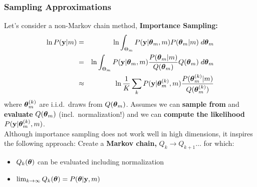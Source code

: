 \begin{frame}
\frametitle{Sampling Approximations}

\vspace*{-1ex}
Let's consider a non-Markov chain method, {\bf Importance Sampling:}\\
\vspace*{-2ex}
\begin{eqnarray*}
\ln P(\mathbf{y}|m) &=& \ln \int_{\Theta_m} P(\mathbf{y}|\boldsymbol{\theta}_m,m)
P(\boldsymbol{\theta}_m|m) \; d \boldsymbol{\theta}_m\\
&=& \ln \int_{\Theta_m} P(\mathbf{y}|\boldsymbol{\theta}_m,m)
\frac{P(\boldsymbol{\theta}_m|m)}{Q(\boldsymbol{\theta}_m)} Q(\boldsymbol{\theta}_m) \; d \boldsymbol{\theta}_m\\
&\approx & \ln \frac{1}{K} \sum_k P(\mathbf{y}|\boldsymbol{\theta}_m^{(k)},m)
\frac{P(\boldsymbol{\theta}_m^{(k)}|m)}{Q(\boldsymbol{\theta}_m^{(k)})} 
\end{eqnarray*}
where $\boldsymbol{\theta}_m^{(k)}$ are i.i.d.\ draws from  
$Q(\boldsymbol{\theta}_m)$. Assumes we can {\bf sample from} and {\bf evaluate} $Q(\boldsymbol{\theta}_m)$
(incl.\ normalization!) and we can {\bf compute the likelihood}
$P(\mathbf{y}|\boldsymbol{\theta}_m^{(k)},m)$. \\[2ex]

Although importance sampling does not work well in high dimensions,
it inspires the following approach:
Create a {\bf Markov chain,} $Q_k \rightarrow Q_{k+1} \ldots$ for which:
\begin{itemize}
\item $Q_k(\boldsymbol{\theta})$ can be evaluated including normalization \vspace*{-1ex}
\item $\lim_{k\rightarrow \infty} Q_k(\boldsymbol{\theta}) = P(\boldsymbol{\theta}|\mathbf{y},m)$
\end{itemize}

\end{frame}
